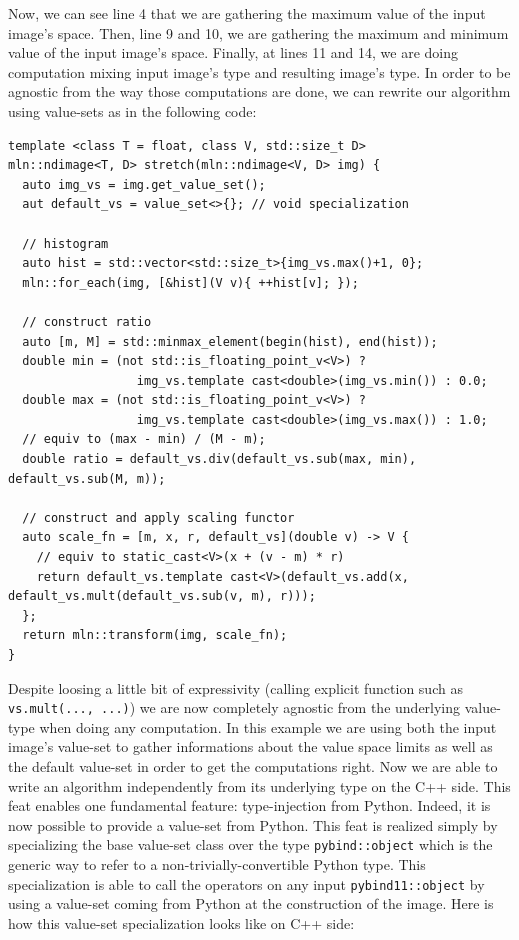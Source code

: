 Now, we can see line 4 that we are gathering the maximum value of the input image's space. Then, line 9 and 10, we are
gathering the maximum and minimum value of the input image's space. Finally, at lines 11 and 14, we are doing
computation mixing input image's type and resulting image's type. In order to be agnostic from the way those
computations are done, we can rewrite our algorithm using value-sets as in the following code:

\begin{verbatim}
template <class T = float, class V, std::size_t D>
mln::ndimage<T, D> stretch(mln::ndimage<V, D> img) {
  auto img_vs = img.get_value_set();
  aut default_vs = value_set<>{}; // void specialization

  // histogram
  auto hist = std::vector<std::size_t>{img_vs.max()+1, 0};
  mln::for_each(img, [&hist](V v){ ++hist[v]; });
  
  // construct ratio
  auto [m, M] = std::minmax_element(begin(hist), end(hist));
  double min = (not std::is_floating_point_v<V>) ?
                  img_vs.template cast<double>(img_vs.min()) : 0.0;
  double max = (not std::is_floating_point_v<V>) ?
                  img_vs.template cast<double>(img_vs.max()) : 1.0;
  // equiv to (max - min) / (M - m);
  double ratio = default_vs.div(default_vs.sub(max, min), default_vs.sub(M, m));

  // construct and apply scaling functor
  auto scale_fn = [m, x, r, default_vs](double v) -> V {
    // equiv to static_cast<V>(x + (v - m) * r)
    return default_vs.template cast<V>(default_vs.add(x, default_vs.mult(default_vs.sub(v, m), r)));
  };
  return mln::transform(img, scale_fn);
}
\end{verbatim}

Despite loosing a little bit of expressivity (calling explicit function such as \texttt{vs.mult(..., ...)}) we are now
completely agnostic from the underlying value-type when doing any computation. In this example we are using both the
input image's value-set to gather informations about the value space limits as well as the default value-set in order to
get the computations right. Now we are able to write an algorithm independently from its underlying type on the C++
side. This feat enables one fundamental feature: type-injection from Python. Indeed, it is now possible to provide a
value-set from Python. This feat is realized simply by specializing the base value-set class over the type
\texttt{pybind::object} which is the generic way to refer to a non-trivially-convertible Python type. This
specialization is able to call the operators on any input \texttt{pybind11::object} by using a value-set coming from
Python at the construction of the image. Here is how this value-set specialization looks like on C++ side:

